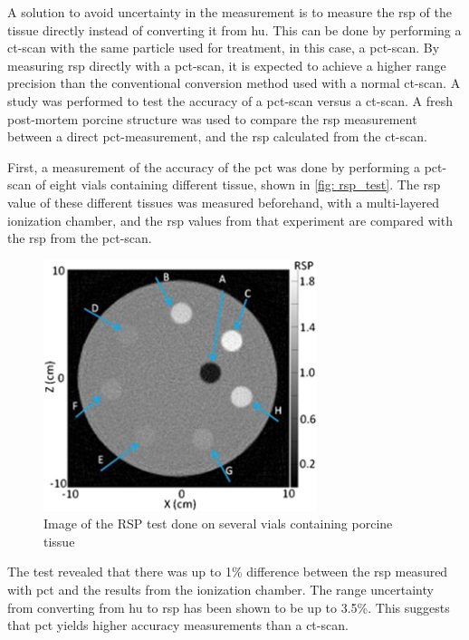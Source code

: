\documentclass[main.tex]{subfiles}
\begin{document}
A solution to avoid uncertainty in the measurement is to measure the \gls{rsp} of the tissue directly instead of converting it from \gls{hu}. This can be done by performing a \gls{ct}-scan with the same particle used for treatment, in this case, a \gls{pct}-scan. By measuring \gls{rsp} directly with a \gls{pct}-scan, it is expected to achieve a higher range precision than the conventional conversion method used with a normal \gls{ct}-scan. A study was performed to test the accuracy of a \gls{pct}-scan versus a \gls{ct}-scan. A fresh post-mortem porcine structure was used to compare the \gls{rsp} measurement between a direct \gls{pct}-measurement, and the \gls{rsp} calculated from the \gls{ct}-scan\cite{porcine_2021}.

First, a measurement of the accuracy of the \gls{pct} was done by performing a \gls{pct}-scan of eight vials containing different tissue, shown in \autoref{fig: rsp_test}. The \gls{rsp} value of these different tissues was measured beforehand, with a multi-layered ionization chamber, and the \gls{rsp} values from that experiment are compared with the \gls{rsp} from the \gls{pct}-scan.

\begin{figure}[!htpb]
    \centering
    \includegraphics[width=8cm ]{images/porcine_phantom.jpg}
    \caption{Image of the RSP test done on several vials containing porcine tissue\cite{porcine_2021}}
    \label{fig: rsp_test}
\end{figure}
\FloatBarrier

The test revealed that there was up to 1\% difference between the \gls{rsp} measured with \gls{pct} and the results from the ionization chamber. The range uncertainty from converting from \gls{hu} to \gls{rsp} has been shown to be up to 3.5\%\cite{Paganetti_2012}. This suggests that \gls{pct} yields higher accuracy measurements than a \gls{ct}-scan. 
\end{document}
